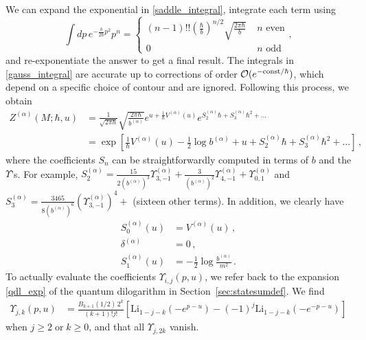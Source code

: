 \documentclass[hyper]{JHEP3}
\def\CO {{\cal O}}
\newcommand\be{\begin{equation}}
\newcommand\ee{\end{equation}}
\begin{document}
We can expand the exponential in \eqref{saddle_integral}, integrate each term using
\be
\int dp\, e^{-\frac{b}{2\hbar}p^2}p^{n} = \left\{
\begin{array}{ll}
 (n-1)!!\left(\frac{\hbar}{b}\right)^{n/2}\sqrt{\frac{2\pi \hbar}{b}} & \;\mbox{$n$ even} \\
 0 & \; \mbox{$n$ odd}
\end{array}
\right.,
\label{gauss_integral}
\ee
and re-exponentiate the answer to get a final result.
The integrals in \eqref{gauss_integral} are accurate up to corrections of order $\CO(e^{-{\rm const}/\hbar})$,
which depend on a specific choice of contour and are ignored.
Following this process, we obtain
\begin{align}
Z^{(\alpha)} (M; \hbar, u)
& = \frac{1}{\sqrt{2 \pi \hbar}} \sqrt{\frac{2\pi \hbar}{b^{(\alpha)}}}
e^{u+\frac{1}{\hbar} V^{(\alpha)}(u)}e^{S_2^{(\alpha)}\hbar+S_3^{(\alpha)}\hbar^2+\ldots} \\
& = \exp\left[\frac{1}{\hbar}V^{(\alpha)}(u)
- \frac{1}{2} \log b^{(\alpha)} + u + S_2^{(\alpha)}\hbar + S_3^{(\alpha)}\hbar^2 + \ldots \right]\,,
\label{final_lambda_int}
\end{align}
where the coefficients $S_n$ can be straightforwardly computed in terms of $b$ and the $\Upsilon$'s.
For example, $S_2^{(\alpha)} = \frac{15}{2(b^{(\alpha)})^3}\Upsilon_{3,-1}^{(\alpha)}+\frac{3}{(b^{(\alpha)})^2}\Upsilon_{4,-1}^{(\alpha)}+\Upsilon_{0,1}^{(\alpha)}$
and $S_3^{(\alpha)} = \frac{3465}{8(b^{(\alpha)})^6}(\Upsilon_{3,-1}^{(\alpha)})^4 +$ (sixteen other terms). In addition, we clearly have
%
\begin{align} S_0^{(\alpha)}(u) &= V^{(\alpha)}(u)\,, \\
 \delta^{(\alpha)} &= 0\,, \\
 S_1^{(\alpha)}(u) &= -\frac{1}{2}\log\frac{b^{(\alpha)}}{m^2}\,. \label{S1calc}
\end{align}
%
%
To actually evaluate the coefficients $\Upsilon_{i,j}(p,u)$,
we refer back to the expansion \eqref{qdl_exp} of the quantum dilogarithm
in Section~\ref{sec:statesumdef}.
We find
\begin{align}
\Upsilon_{j,k}(p,u) &=\frac{B_{k+1}(1/2)\,2^k}{(k+1)! j!}
\left[\text{Li}_{1-j-k} (-e^{p-u})-(-1)^j \text{Li}_{1-j-k} (-e^{-p-u})\right]
\label{jklambda}
\end{align}
when $j\geq 2 \;\mbox{or}\; k \geq 0$, and that all $\Upsilon_{j,2k}$ vanish.
\end{document}
